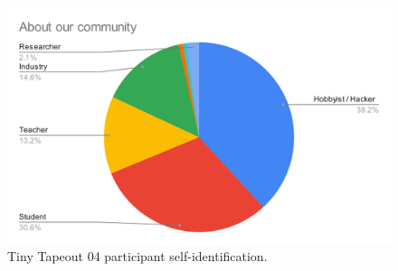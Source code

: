 \begin{figure}[!t]
\centering
\includegraphics[width=\columnwidth]{./Figs/about our community pie chart.png}
\caption{Tiny Tapeout 04 participant self-identification.}
\label{fig:TT04_submitters}
\end{figure}
